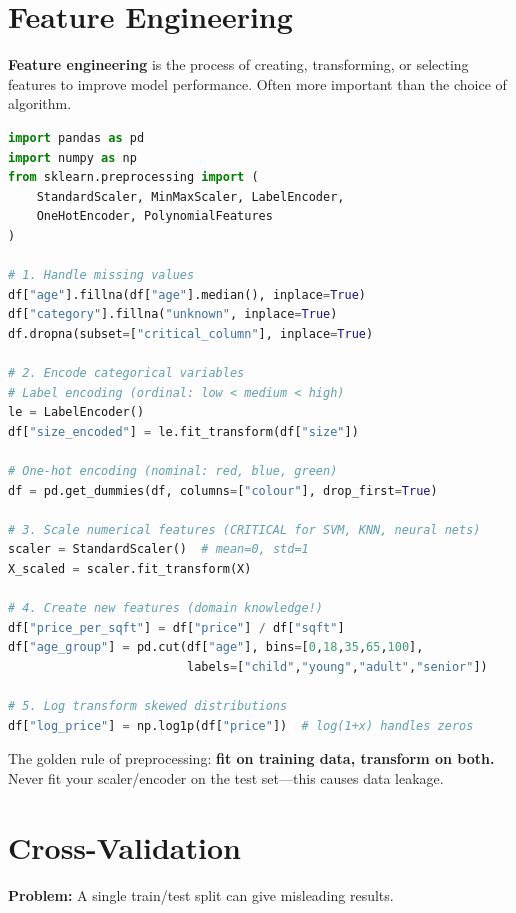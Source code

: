 \documentclass[12pt, a4paper, oneside]{book}
\begin{document}
\section{Feature Engineering}

\textbf{Feature engineering} is the process of creating, transforming, or selecting features to improve model performance. Often more important than the choice of algorithm.

\begin{lstlisting}[language=Python, caption={Feature engineering techniques}]
import pandas as pd
import numpy as np
from sklearn.preprocessing import (
    StandardScaler, MinMaxScaler, LabelEncoder,
    OneHotEncoder, PolynomialFeatures
)

# 1. Handle missing values
df["age"].fillna(df["age"].median(), inplace=True)
df["category"].fillna("unknown", inplace=True)
df.dropna(subset=["critical_column"], inplace=True)

# 2. Encode categorical variables
# Label encoding (ordinal: low < medium < high)
le = LabelEncoder()
df["size_encoded"] = le.fit_transform(df["size"])

# One-hot encoding (nominal: red, blue, green)
df = pd.get_dummies(df, columns=["colour"], drop_first=True)

# 3. Scale numerical features (CRITICAL for SVM, KNN, neural nets)
scaler = StandardScaler()  # mean=0, std=1
X_scaled = scaler.fit_transform(X)

# 4. Create new features (domain knowledge!)
df["price_per_sqft"] = df["price"] / df["sqft"]
df["age_group"] = pd.cut(df["age"], bins=[0,18,35,65,100],
                         labels=["child","young","adult","senior"])

# 5. Log transform skewed distributions
df["log_price"] = np.log1p(df["price"])  # log(1+x) handles zeros
\end{lstlisting}

\begin{tipbox}
The golden rule of preprocessing: \textbf{fit on training data, transform on both.} Never fit your scaler/encoder on the test set---this causes data leakage.
\end{tipbox}

\section{Cross-Validation}

\textbf{Problem:} A single train/test split can give misleading results.
\end{document}
